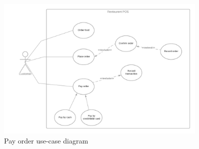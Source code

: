 \begin{figure}[H]
  \centering
  \includegraphics[width=0.9\textwidth]{./assets/t1/PayOrder.png}
  \caption{Pay order use-case diagram}
\end{figure}

